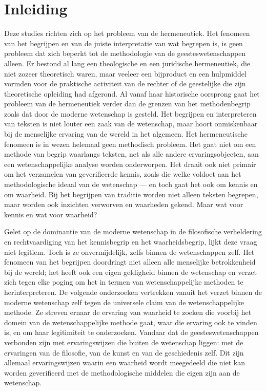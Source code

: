 \chapter*{Inleiding}

Deze studies richten zich op het probleem van de hermeneutiek. Het fenomeen van het begrijpen en van de juiste interpretatie van wat begrepen is, is geen probleem dat zich beperkt tot de methodologie van de geesteswetenschappen alleen. Er bestond al lang een theologische en een juridische hermeneutiek, die niet zozeer theoretisch waren, maar veeleer een bijproduct en een hulpmiddel vormden voor de praktische activiteit van de rechter of de geestelijke die zijn theoretische opleiding had afgerond. Al vanaf haar historische oorsprong gaat het probleem van de hermeneutiek verder dan de grenzen van het methodenbegrip zoals dat door de moderne wetenschap is gesteld. Het begrijpen en interpreteren van teksten is niet louter een zaak van de wetenschap, maar hoort onmiskenbaar bij de menselijke ervaring van de wereld in het algemeen. Het hermeneutische fenomeen is in wezen helemaal geen methodisch probleem. Het gaat niet om een methode van begrip waarlangs teksten, net als alle andere ervaringsobjecten, aan een wetenschappelijke analyse worden onderworpen. Het draait ook niet primair om het verzamelen van geverifieerde kennis, zoals die welke voldoet aan het methodologische ideaal van de wetenschap — en toch gaat het ook om kennis en om waarheid. Bij het begrijpen van traditie worden niet alleen teksten begrepen, maar worden ook inzichten verworven en waarheden gekend. Maar wat voor kennis en wat voor waarheid?

Gelet op de dominantie van de moderne wetenschap in de filosofische verheldering en rechtvaardiging van het kennisbegrip en het waarheidsbegrip, lijkt deze vraag niet legitiem. Toch is ze onvermijdelijk, zelfs binnen de wetenschappen zelf. Het fenomeen van het begrijpen doordringt niet alleen alle menselijke betrokkenheid bij de wereld; het heeft ook een eigen geldigheid binnen de wetenschap en verzet zich tegen elke poging om het in termen van wetenschappelijke methoden te herinterpreteren. De volgende onderzoeken vertrekken vanuit het verzet binnen de moderne wetenschap zelf tegen de universele claim van de wetenschappelijke methode. Ze streven ernaar de ervaring van waarheid te zoeken die voorbij het domein van de wetenschappelijke methode gaat, waar die ervaring ook te vinden is, en om haar legitimiteit te onderzoeken. Vandaar dat de geesteswetenschappen verbonden zijn met ervaringswijzen die buiten de wetenschap liggen: met de ervaringen van de filosofie, van de kunst en van de geschiedenis zelf. Dit zijn allemaal ervaringswijzen waarin een waarheid wordt meegedeeld die niet kan worden geverifieerd met de methodologische middelen die eigen zijn aan de wetenschap.


